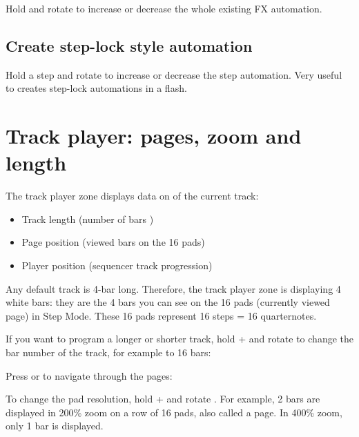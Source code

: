 Hold  and rotate \encodericon{} to increase or decrease the whole existing FX automation.

\subsection{Create step-lock style automation}

Hold a step \padsicon{} and rotate \encodericon{} to increase or decrease the step automation. Very useful to creates step-lock automations in a flash.



\section{Track player: pages, zoom and length}

The track player zone displays data on of the current track:

\begin{itemize}
\item \tracklenicon{} Track length (number of bars \baricon{})
\item \pageposicon{} Page position (viewed bars on the 16 pads)
\item \playerposicon{} Player position (sequencer track progression)
\end{itemize}

Any default track is 4-bar long. Therefore, the track player zone is displaying 4 white bars: they are the 4 bars you can see on the 16 pads (currently viewed page) in Step Mode. These 16 pads represent 16 steps = 16 quarternotes.


If you want to program a longer or shorter track, hold  +  and rotate \encodericon{} to change the bar number of the track, for example to 16 bars:


Press \btn{<} or \btn{>} to navigate through the pages:



To change the pad resolution, hold  +  and rotate \encodericon{}. For example, 2 bars are displayed in 200\% zoom on a row of 16 pads, also called a page. In 400\% zoom, only 1 bar is displayed.

